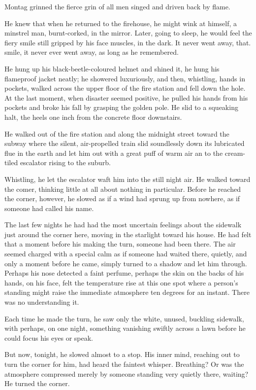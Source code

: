 \documentclass[11pt,openany]{book}
\begin{document}
Montag grinned the fierce grin of all men singed and driven back by flame.

He knew that when he returned to the firehouse, he might wink at himself, a minstrel man, burnt-corked, in the mirror. Later, going to sleep, he would feel the fiery smile still gripped by his face muscles, in the dark. It never went away, that. smile, it never ever went away, as long as he remembered.

He hung up his black-beetle-coloured helmet and shined it, he hung his flameproof jacket neatly; he showered luxuriously, and then, whistling, hands in pockets, walked across the upper floor of the fire station and fell down the hole. At the last moment, when disaster seemed positive, he pulled his hands from his pockets and broke his fall by grasping the golden pole. He slid to a squeaking halt, the heels one inch from the concrete floor downstairs.

He walked out of the fire station and along the midnight street toward the subway where the silent, air-propelled train slid soundlessly down its lubricated flue in the earth and let him out with a great puff of warm air an to the cream-tiled escalator rising to the suburb.

Whistling, he let the escalator waft him into the still night air. He walked toward the comer, thinking little at all about nothing in particular. Before he reached the corner, however, he slowed as if a wind had sprung up from nowhere, as if someone had called his name.

The last few nights he had had the most uncertain feelings about the sidewalk just around the corner here, moving in the starlight toward his house. He had felt that a moment before his making the turn, someone had been there. The air seemed charged with a special calm as if someone had waited there, quietly, and only a moment before he came, simply turned to a shadow and let him through. Perhaps his nose detected a faint perfume, perhaps the skin on the backs of his hands, on his face, felt the temperature rise at this one spot where a person's standing might raise the immediate atmosphere ten degrees for an instant. There was no understanding it.

Each time he made the turn, he saw only the white, unused, buckling sidewalk, with perhaps, on one night, something vanishing swiftly across a lawn before he could focus his eyes or speak.

But now, tonight, he slowed almost to a stop. His inner mind, reaching out to turn the corner for him, had heard the faintest whisper. Breathing? Or was the atmosphere compressed merely by someone standing very quietly there, waiting? He turned the corner.
\end{document}
